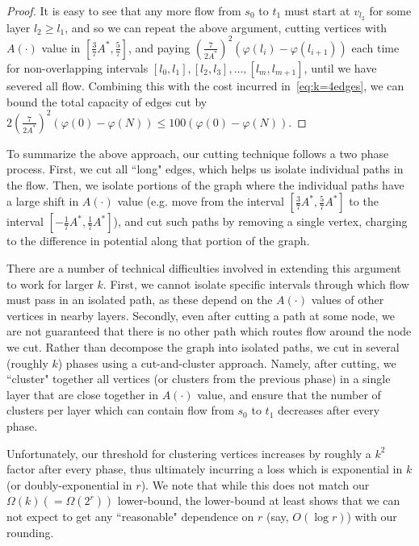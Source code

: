 \begin{proof}
It is easy to see that any more flow from $s_0$ to $t_1$ must start at $v_{l_2}$ for some layer $l_2\geq l_1$, and so we can repeat the above argument, cutting vertices with $A(\cdot)$ value in $[\frac37A^*,\frac57]$, and paying $(\frac7{2A^*})^2(\varphi(l_i)-\varphi(l_{i+1}))$  each time for non-overlapping intervals $[l_0,l_1],[l_2,l_3],\ldots,[l_m,l_{m+1}]$, until we have severed all flow. Combining this with the cost incurred in~\eqref{eq:k=4edges}, we can bound the total capacity of edges cut by $2({\textstyle\frac7{2A^*}})^2(\varphi(0)-\varphi(N))\leq100(\varphi(0)-\varphi(N)).$
\end{proof}
\fi

To summarize the above approach, our cutting technique follows a two phase process. First, we cut all ``long" edges, which helps us isolate individual paths in the flow. Then, we isolate portions of the graph where the individual paths have a large shift in $A(\cdot)$ value (e.g. move from the interval $[\frac37A^*,\frac57A^*]$ to the interval $[-\frac17A^*,\frac17A^*]$), and cut such paths by removing a single vertex, charging to the difference in potential along that portion of the graph.

There are a number of technical difficulties involved in extending this argument to work for larger $k$. First, we cannot isolate specific intervals through which flow must pass in an isolated path, as these depend on the $A(\cdot)$ values of other vertices in nearby layers. Secondly, even after cutting a path at some node, we are not guaranteed that there is no other path which routes flow around the node we cut. Rather than decompose the graph into isolated paths, we cut in several (roughly $k$) phases using a cut-and-cluster approach. Namely, after cutting, we ``cluster" together all vertices (or clusters from the previous phase) in a single layer that are close together in $A(\cdot)$ value, and ensure that the number of clusters per layer which can contain flow from $s_0$ to $t_1$ decreases after every phase.

Unfortunately, our threshold for clustering vertices increases by roughly a $k^2$ factor after every phase, thus ultimately incurring a loss which is exponential in $k$ (or doubly-exponential in $r$). We note that while this does not match our $\Omega(k)(=\Omega(2^r))$ lower-bound, the lower-bound at least shows that we can not expect to get any ``reasonable" dependence on $r$ (say, $O(\log r)$) with our rounding.

\iffalse

